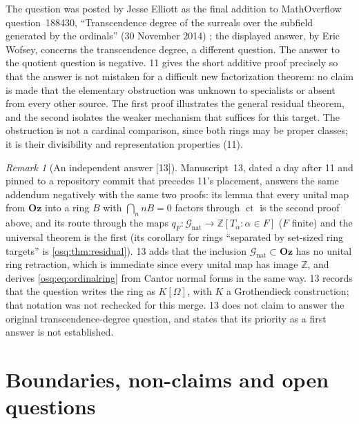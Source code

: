 \documentclass[11pt,letterpaper]{article}
\numberwithin{equation}{section}
\theoremstyle{definition}
\theoremstyle{remark}
\newtheorem{remark}[remark]{Remark}
\theoremstyle{plain}
\newcommand{\Oz}{\mathbf{Oz}}
\newcommand{\Z}{\mathbb Z}
\newcommand{\ct}{\operatorname{ct}}
\newcommand{\src}[1]{\textup{\textsf{[#1]}}}
\begin{document}
The question was posted by Jesse Elliott as the final addition to MathOverflow question~188430,
``Transcendence degree of the surreals over the subfield generated by the ordinals'' (30 November 2014)
\cite{MO188430}; the displayed answer, by Eric Wofsey, concerns the transcendence degree, a different
question. The answer to the quotient question is negative. 11 gives the short additive proof precisely so
that the answer is not mistaken for a difficult new factorization theorem: no claim is made that the
elementary obstruction was unknown to specialists or absent from every other source. The first proof
illustrates the general residual theorem, and the second isolates the weaker mechanism that suffices for
this target. The obstruction is not a cardinal comparison, since both rings may be proper classes; it is
their divisibility and representation properties (11).

\begin{remark}[An independent answer \src{13}]\label{osq:str:rem:elliott}
Manuscript~13, dated a day after 11 and pinned to a repository commit that precedes 11's placement, answers the same addendum negatively with
the same two proofs: its lemma that every unital map from $\Oz$ into a ring $B$ with $\bigcap_nnB=0$ factors through
$\ct$ is the second proof above, and its route through the maps
$q_F:\mathcal G_{\mathrm{nat}}\to\Z[T_\alpha:\alpha\in F]$ ($F$ finite) and the universal theorem is the first
(its corollary for rings ``separated by set-sized ring targets'' is \cref{osq:thm:residual}). 13 adds that the
inclusion $\mathcal G_{\mathrm{nat}}\subset\Oz$ has no unital ring retraction, which is immediate since every unital map
has image $\Z$, and derives \eqref{osq:eq:ordinalring} from Cantor normal forms in the same way. 13 records that the
question writes the ring as $K[\Omega]$, with $K$ a Grothendieck construction; that notation was not rechecked for
this merge. 13 does not claim to answer the original transcendence-degree question, and states that its priority as
a first answer is not established.
\end{remark}

\section{Boundaries, non-claims and open questions}\label{osq:sec:boundaries}
\end{document}
